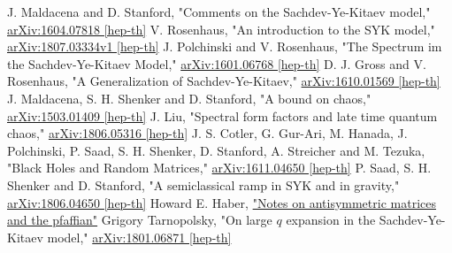 \begin{thebibliography}{99}
		J. Maldacena and D. Stanford,
		"Comments on the Sachdev-Ye-Kitaev model,"
		\href{https://arxiv.org/pdf/1604.07818.pdf}{arXiv:1604.07818 [hep-th]}
		V. Rosenhaus,
		"An introduction to the SYK model,"
		\href{https://arxiv.org/pdf/1807.03334.pdf}{arXiv:1807.03334v1 [hep-th]}
		J. Polchinski and V. Rosenhaus,
		"The Spectrum im the Sachdev-Ye-Kitaev Model,"
		\href{https://arxiv.org/pdf/1601.06768.pdf}{arXiv:1601.06768 [hep-th]}
		D. J. Gross and V. Rosenhaus,
		"A Generalization of Sachdev-Ye-Kitaev,"
		\href{https://arxiv.org/pdf/1610.01569.pdf}{arXiv:1610.01569 [hep-th]}
		J. Maldacena, S. H. Shenker and D. Stanford,
		"A bound on chaos,"
		\href{https://arxiv.org/pdf/1503.01409.pdf}{arXiv:1503.01409 [hep-th]}
		J. Liu,
		"Spectral form factors and late time quantum chaos,"
		\href{https://arxiv.org/pdf/1806.05316.pdf}{arXiv:1806.05316 [hep-th]}
		J. S. Cotler, G. Gur-Ari, M. Hanada, J. Polchinski, P. Saad, S. H. Shenker,
		D. Stanford, A. Streicher and M. Tezuka,
		"Black Holes and Random Matrices,"
		\href{https://arxiv.org/pdf/1611.04650.pdf}{arXiv:1611.04650 [hep-th]}
		P. Saad, S. H. Shenker and D. Stanford,
		"A semiclassical ramp in SYK and in gravity,"
		\href{https://arxiv.org/pdf/1806.06840.pdf}{arXiv:1806.04650 [hep-th]}
	Howard E. Haber,
	\href{http://scipp.ucsc.edu/~haber/webpage/pfaffian2.pdf}{"Notes on antisymmetric matrices and the pfaffian"}
		Grigory Tarnopolsky,
		"On large $q$ expansion in the Sachdev-Ye-Kitaev model,"
		\href{https://arxiv.org/pdf/1801.06871.pdf}{arXiv:1801.06871 [hep-th]}
\end{thebibliography}
